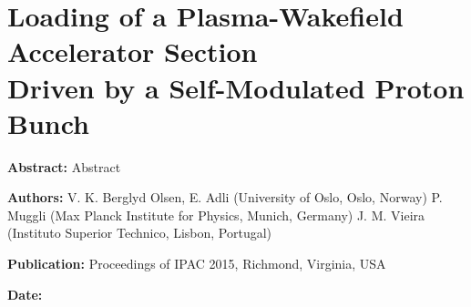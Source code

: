 %
%

\chapter{Loading of a Plasma-Wakefield Accelerator Section\\
         Driven by a Self-Modulated Proton Bunch}
\label{Pub:IPAC15}

\begin{hangparas}{10mm}{1}

    \textbf{Abstract:}
    Abstract

    \vspace{8mm}

    \textbf{Authors:}
    V. K. Berglyd Olsen, E. Adli (University of Oslo, Oslo, Norway)
    P. Muggli (Max Planck Institute for Physics, Munich, Germany)
    J. M. Vieira (Instituto Superior Technico, Lisbon, Portugal)


    \vspace{5mm}

    \textbf{Publication:}
    Proceedings of IPAC 2015, Richmond, Virginia, USA

    \vspace{5mm}

    \textbf{Date:}

\end{hangparas}
